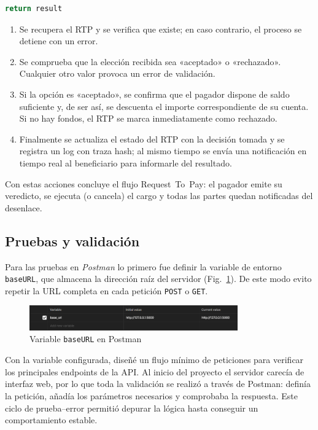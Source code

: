 \begin{itemize}
\begin{lstlisting}[language=Python, style=custom]
                return result
        \end{lstlisting}

        \begin{enumerate}
          \item Se recupera el RTP y se verifica que existe; en caso
                contrario, el proceso se detiene con un error.  
          \item Se comprueba que la elección recibida sea «aceptado» o
                «rechazado».  Cualquier otro valor provoca un error de
                validación.  
          \item Si la opción es «aceptado», se confirma que el pagador
                dispone de saldo suficiente y, de ser así, se descuenta el
                importe correspondiente de su cuenta.  Si no hay fondos, el
                RTP se marca inmediatamente como rechazado.  
          \item Finalmente se actualiza el estado del RTP con la decisión
                tomada y se registra un log con traza hash; al mismo tiempo
                se envía una notificación en tiempo real al beneficiario
                para informarle del resultado.  
        \end{enumerate}
        \bigskip

        Con estas acciones concluye el flujo Request~To~Pay: el pagador
        emite su veredicto, se ejecuta (o cancela) el cargo y todas las
        partes quedan notificadas del desenlace.
\end{itemize}

\subsection{Pruebas y validación}
\label{subsubsec:PruebasValidacion}
Para las pruebas en \emph{Postman} lo primero fue definir la variable de entorno
\texttt{baseURL}, que almacena la dirección raíz del servidor
(Fig.~\ref{fig:baseURL}).  
De este modo evito repetir la URL completa en cada petición \texttt{POST} o
\texttt{GET}.

\begin{figure}[H]
  \centering
  \includegraphics[width=0.8\textwidth]{Imagenes/baseURL.png}
  \caption{Variable \texttt{baseURL} en Postman}
  \label{fig:baseURL}
\end{figure}
Con la variable configurada, diseñé un flujo mínimo de peticiones para
verificar los principales endpoints de la API.  
Al inicio del proyecto el servidor carecía de interfaz web, por lo que toda la
validación se realizó a través de Postman: definía la petición, añadía los
parámetros necesarios y comprobaba la respuesta.  
Este ciclo de prueba–error permitió depurar la lógica hasta conseguir un
comportamiento estable.

